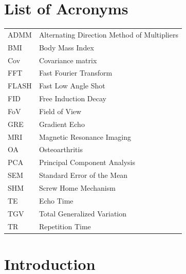\documentclass{micro-econ-thesis}
\begin{document}
\section*{List of Acronyms}
\begin{tabular}{@{}ll}
ADMM & Alternating Direction Method of Multipliers \\
BMI & Body Mass Index \\
Cov & Covariance matrix \\
FFT & Fast Fourier Transform \\ 
FLASH & Fast Low Angle Shot \\
FID & Free Induction Decay \\
FoV & Field of View \\
GRE & Gradient Echo \\
MRI & Magnetic Resonance Imaging \\
OA & Osteoarthritis\\
PCA & Principal Component Analysis \\
SEM & Standard Error of the Mean \\
SHM & Screw Home Mechanism \\
TE & Echo Time \\
TGV & Total Generalized Variation \\
TR & Repetition Time 

\end{tabular}


\cleardoublepage
\pagestyle{headings}
\setcounter{page}{1}
\onehalfspacing %

\section{Introduction}
\end{document}
